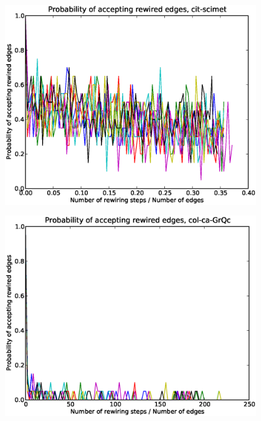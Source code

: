 \documentclass[12pt]{article}
\begin{document}
\begin{figure}[p]
\includegraphics[scale=0.75]{Paccept-cit-scimet.eps}\\
\end{figure}


\begin{figure}[p]
\includegraphics[scale=0.75]{Paccept-col-ca-GrQc.eps}\\
\end{figure}
\end{document}
